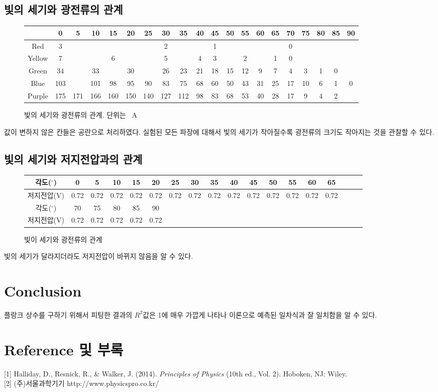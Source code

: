 \documentclass[a4paper]{article}
\begin{document}
	\subsection{빛의 세기와 광전류의 관계}
		\begin{figure}[h]
		\centering
			\begin{tabular}{|c|c|c|c|c|c|c|c|c|c|c|c|c|c|c|c|c|c|c|c|}
			\hline
			\diagbox{색깔}{각도($^{\circ}$)} & 0 & 5 & 10 & 15 & 20 & 25 & 30 & 35 & 40 & 45 & 50 & 55 & 60 & 65 & 70 & 75 & 80 & 85 & 90 \\
			\hline
			Red & 3 & & & & & & 2 & & & 1 & & & & & 0 & & & & \\
			\hline
			Yellow & 7 & & & 6 & & & 5 & & 4 & 3 & & 2 & & 1 & 0 & & & & \\
			\hline
			Green & 34 & & 33 & & 30 & & 26 & 23 & 21 & 18 & 15 & 12 & 9 & 7 & 4 & 3 & 1 & 0 & \\
			\hline
			Blue & 103 & & 101 & 98 & 95 & 90 & 83 & 75 & 68 & 60 & 50 & 43 & 31 &25 & 17 & 10 & 6 & 1& 0 \\
			\hline 
			Purple & 175 & 171 & 166 & 160 & 150 & 140 & 127 & 112 & 98 & 83 & 68 & 53 & 40 & 28 & 17 & 9 & 4 & 2 \\
			\hline
		\end{tabular}
		\caption{빛의 세기와 광전류의 관계. 단위는 \si{\mu A}}
	\end{figure}
	값이 변하지 않은 칸들은 공란으로 처리하였다. 
	실험된 모든 파장에 대해서 빛의 세기가 작아질수록 광전류의 크기도 작아지는 것을 관찰할 수 있다.

	\subsection{빛의 세기와 저지전압과의 관계}
		\begin{figure}[h]
			\begin{tabular}{|c|c|c|c|c|c|c|c|c|c|c|c|c|c|c|c|c|c|}
			\hline
			각도($^{\circ}$) & 0 & 5 & 10 & 15 & 20 & 25 & 30 & 35 & 40 & 45 & 50 & 55 & 60 & 65 \\
			\hline
			저지전압(\si{V}) & 0.72 & 0.72 & 0.72 & 0.72 & 0.72 & 0.72 & 0.72 & 0.72 & 0.72 & 0.72 & 0.72 & 0.72 & 0.72 & 0.72 \\
			\hline
			각도($^{\circ}$) & 70 & 75 & 80 & 85 & 90 \\
			\hline
			저지전압(\si{V}) & 0.72 & 0.72 & 0.72 & 0.72 & 0.72 \\	
			\hline
			\end{tabular}
			\caption{빛이 세기와 광전류의 관계}
		\end{figure}
		빛의 세기가 달라지더라도 저지전압이 바뀌지 않음을 알 수 있다.

	\section{Conclusion}
	플랑크 상수를 구하기 위해서 피팅한 결과의 $R^2$값은 1에 매우 가깝게 나타나 이론으로 예측된 일차식과 잘 일치함을 알 수 있다.
	

\section{Reference 및 부록}
	[1] Halliday, D., Resnick, R., \& Walker, J. (2014). {\it{}Principles of Physics} (10th ed., Vol. 2). Hoboken, NJ: Wiley. \\
	{[2]} (주)서울과학기기 http://www.physicspro.co.kr/
\end{document}
